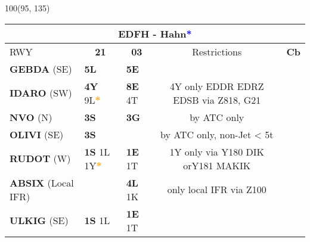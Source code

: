 \documentclass[10pt,landscape,a4paper]{article}
\begin{document}
\begin{textblock}{100}(95, 135)
\begin{table}[]
\begin{tabular}{|llllll}
\multicolumn{6}{c}{\textbf{EDFH - Hahn\textcolor{blue}{*}}} \\ \hline
\multicolumn{1}{|l|}{RWY} 									& \multicolumn{1}{c|}{\textbf{21}} 			& \multicolumn{1}{c|}{\textbf{03}}  				& \multicolumn{2}{c|}{Restrictions} 				& \multicolumn{1}{c|}{\textbf{Cb}} 							\\ \hline
\multicolumn{1}{|l|}{\textbf{GEBDA} (SE)}							& \multicolumn{1}{l|}{\textbf{5L}}			& \multicolumn{1}{l|}{\textbf{5E}} 				& \multicolumn{2}{c|}{}						& \multicolumn{1}{c|}{\multirow{7}{*}{\rotatebox{90}{5000ft}}}			 \\ \cline{1-5}
\multicolumn{1}{|l|}{\textbf{IDARO} (SW)}							& \multicolumn{1}{l|}{\textbf{4Y} 9L\textbf{\textcolor{orange}{*}}}	& \multicolumn{1}{l|}{\textbf{ 8E} 4T}	& \multicolumn{2}{c|}{4Y only EDDR EDRZ EDSB  via Z818, G21}  & \multicolumn{1}{c|}{}								\\ \cline{1-5}

\multicolumn{1}{|l|}{\textbf{NVO} (N)} 								& \multicolumn{1}{l|}{\textbf{3S}} 			& \multicolumn{1}{l|}{\textbf{3G}}				& \multicolumn{2}{c|}{by ATC only} 				& \multicolumn{1}{c|}{} 									\\ \cline{1-5}
\multicolumn{1}{|l|}{\textbf{OLIVI} (SE)}							& \multicolumn{1}{l|}{\textbf{3S}}			& \multicolumn{1}{l|}{}						& \multicolumn{2}{c|}{by ATC only, non-Jet < 5t} 		& \multicolumn{1}{c|}{}									\\ \cline{1-5} 

\multicolumn{1}{|l|}{\textbf{RUDOT} (W)} 							& \multicolumn{1}{l|}{\textbf{1S} 1L 1Y\textbf{\textcolor{orange}{*}}}& \multicolumn{1}{l|}{\textbf{1E} 1T}	& \multicolumn{2}{c|}{1Y only via Y180 DIK orY181 MAKIK}	& \multicolumn{1}{c|}{}			 						\\\cline{1-5} 
\multicolumn{1}{|l|}{\textbf{ABSIX} (Local IFR)} 						& \multicolumn{1}{l|}{}					& \multicolumn{1}{l|}{\textbf{4L} 1K}				& \multicolumn{2}{c|}{only local IFR  via Z100}		& \multicolumn{1}{c|}{}									\\\cline{1-5} 
\multicolumn{1}{|l|}{\textbf{ULKIG} (SE)} 							& \multicolumn{1}{l|}{\textbf{1S} 1L} 			& \multicolumn{1}{l|}{\textbf{1E} 1T}				& \multicolumn{2}{c|}{}  						& \multicolumn{1}{c|}{}									\\ \hline
\end{tabular}
\end{table}
\end{textblock}
\end{document}

